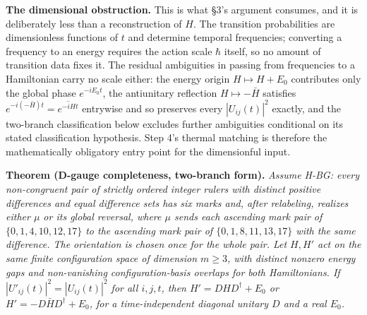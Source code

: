 \documentclass[
]{article}
\begin{document}
\textbf{The dimensional obstruction.} This is what §3's argument
consumes, and it is deliberately less than a reconstruction of \(H\).
The transition probabilities are dimensionless functions of \(t\) and
determine temporal frequencies; converting a frequency to an energy
requires the action scale \(\hbar\) itself, so no amount of transition
data fixes it. The residual ambiguities in passing from frequencies to a
Hamiltonian carry no scale either: the energy origin
\(H \mapsto H + E_0\) contributes only the global phase \(e^{-iE_0 t}\),
the antiunitary reflection \(H \mapsto -\bar{H}\) satisfies
\(e^{-i(-\bar{H})t} = \overline{e^{-iHt}}\) entrywise and so preserves
every \(|U_{ij}(t)|^2\) exactly, and the two-branch classification below
excludes further ambiguities conditional on its stated classification
hypothesis. Step 4's thermal matching is therefore the mathematically
obligatory entry point for the dimensionful input.

\textbf{Theorem (D-gauge completeness, two-branch form).} \emph{Assume
H-BG: every non-congruent pair of strictly ordered integer rulers with
distinct positive differences and equal difference sets has six marks
and, after relabeling, realizes either \(\mu\) or its global reversal,
where \(\mu\) sends each ascending mark pair of \(\{0,1,4,10,12,17\}\)
to the ascending mark pair of \(\{0,1,8,11,13,17\}\) with the same
difference. The orientation is chosen once for the whole pair. Let
\(H,H'\) act on the same finite configuration space of dimension
\(m\ge3\), with distinct nonzero energy gaps and non-vanishing
configuration-basis overlaps for both Hamiltonians. If
\(|U'_{ij}(t)|^2 = |U_{ij}(t)|^2\) for all \(i,j,t\), then
\(H' = DHD^\dagger + E_0\) or \(H' = -D\bar{H}D^\dagger + E_0\), for a
time-independent diagonal unitary \(D\) and a real \(E_0\).}
\end{document}
